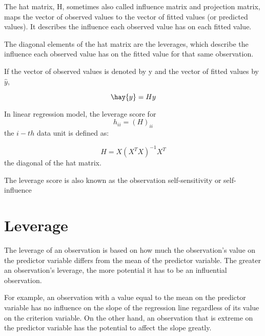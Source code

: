 \documentclass[residuals.tex]{subfiles}
\begin{document}
The hat matrix, H, sometimes also called influence matrix and projection matrix, maps the vector of observed values to the vector of 
fitted values (or predicted values). It describes the influence each observed value has on each fitted value.

The diagonal elements of the hat matrix are the leverages, which describe the influence each observed value has on the fitted value for that same observation.
 
If the vector of observed values is denoted by y and the vector of fitted values by $\hat{y}$,
 
\[ \hay{y} = H y\]



In linear regression model, the leverage score for \[ h_{ii} = (H)_{ii}\] the $i-th$ data unit is defined as:

 
\[ H = X(X^{T} X)^{-1}X^{T} \]
the diagonal of the hat matrix.


The leverage score is also known as the observation self-sensitivity or self-influence



\section{Leverage}
The leverage of an observation is based on how much the observation's value on the predictor variable differs from the 
mean of the predictor variable. The greater an observation's leverage, the more potential it has to be an influential observation. 

For example, an observation with a value equal to the mean on the predictor variable has no influence on the slope of the regression line regardless of its value on the criterion variable. On the other hand, an observation that is extreme on the predictor variable has the potential to affect the slope greatly.
\end{document}
